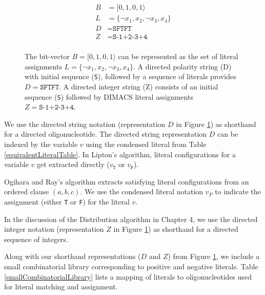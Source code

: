 \begin{figure}[htbp]
\begin{center}

	\begin{align*}
	B &= [0, 1, 0, 1 \rangle \\
	L &= \{ \neg x_1, x_2, \neg x_3, x_4 \} \\
	D &= \texttt{SFTFT}\\ 
	Z &= \texttt{S-1+2-3+4}\\ 
	\end{align*}

\caption{The bit-vector $B = [0, 1, 0, 1 \rangle$ can be represented as the set of literal assignments $L = \{ \neg x_1, x_2, \neg x_3, x_4 \}$.  A directed polarity string (D) with initial sequence (\texttt{S}), followed by a sequence of literals provides $D = \texttt{SFTFT}$.  A directed integer string (Z) consists of an initial sequence (\texttt{S}) followed by DIMACS literal assignments $Z =\texttt{S-1+2-3+4}$. }
\label{equivalentWitnessRepresentations}
\end{center}
\end{figure}

\FloatBarrier

We use the directed string notation (representation $D$ in Figure \ref{equivalentWitnessRepresentations}) as shorthand for a directed oligonucleotide.  The directed string representation $D$ can be indexed by the variable $v$ using the condensed literal from Table \ref{equivalentLiteralTable}.  In Lipton's algorithm, literal configurations for a variable $v$ get extracted directly ($v_{\texttt{T}}$ or $v_{\texttt{F}}$).

Ogihara and Ray's algorithm extracts satisfying literal configurations from an ordered clause $(a, b, c)$.  We use the condensed literal notation $v_P$ to indicate the assignment (either \texttt{T} or \texttt{F}) for the literal $v$.  

In the discussion of the Distribution algorithm in Chapter 4, we use the directed integer notation (representation $Z$ in Figure \ref{equivalentWitnessRepresentations}) as shorthand for a directed sequence of integers.

Along with our shorthand representations ($D$ and $Z$) from Figure \ref{equivalentWitnessRepresentations}, we include a small combinatorial library corresponding to positive and negative literals.  Table \ref{smallCombinatorialLibrary} lists a mapping of literals to oligonucleotides used for literal matching and assignment.  


